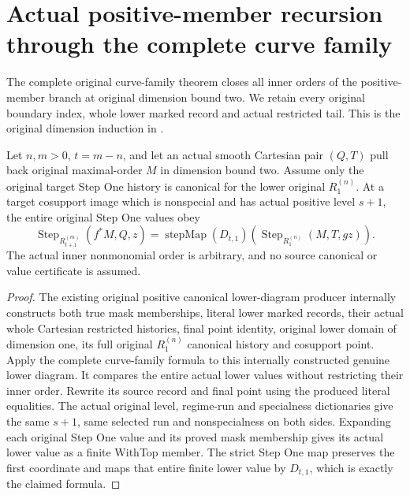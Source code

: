 \section{Actual positive-member recursion through the complete curve family}

The complete original curve-family theorem closes all inner orders of the
positive-member branch at original dimension bound two. We retain every
original boundary index, whole lower marked record and actual restricted tail.
This is the original dimension induction in
\cite{wlodarczyk05-hironaka,bierstone-milman08-functoriality}.

\begin{theorem}
\label{hir:smooth-original-positive-curve-lower-value}
\leanok
{}
Let $n,m>0$, $t=m-n$, and let an actual smooth Cartesian pair $(Q,T)$
pull back original maximal-order $M$ in dimension bound two. Assume only
the original target Step One history is canonical for the lower original
$R^{(n)}_1$. At a target cosupport image which is nonspecial and has
actual positive level $s+1$, the entire original Step One values obey
\[\operatorname{Step}_{R^{(m)}_{t+1}}(f^*M,Q,z)
  =\operatorname{stepMap}(D_{t,1})
    (\operatorname{Step}_{R^{(n)}_1}(M,T,gz)).\]
The actual inner nonmonomial order is arbitrary, and no source canonical
or value certificate is assumed.
\end{theorem}
\begin{proof}
The existing original positive canonical lower-diagram producer internally
constructs both true mask memberships, literal lower marked records,
their actual whole Cartesian restricted histories, final point identity,
original lower domain of dimension one, its full original $R^{(n)}_1$
canonical history and cosupport point. Apply the complete curve-family
formula to this internally constructed genuine lower diagram. It compares
the entire actual lower values without restricting their inner order.
Rewrite its source record and final point using the produced literal
equalities. The actual original level, regime-run and specialness
dictionaries give the same $s+1$, same selected run and nonspecialness
on both sides. Expanding each original Step One value and its proved
mask membership gives its actual lower value as a finite WithTop member.
The strict Step One map preserves the first coordinate and maps that
entire finite lower value by $D_{t,1}$, which is exactly the claimed formula.
\end{proof}

